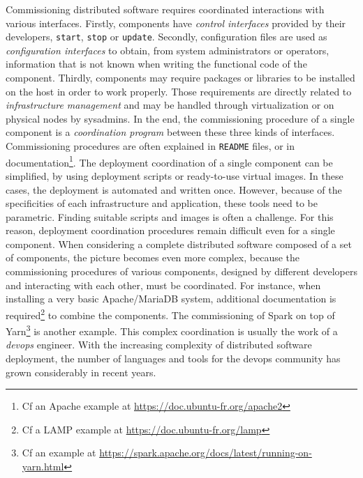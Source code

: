 Commissioning distributed software requires coordinated interactions
with various interfaces. Firstly, components have \emph{control
  interfaces} provided by their developers, \eg \texttt{start},
\texttt{stop} or \texttt{update}. Secondly, configuration files are
used as \emph{configuration interfaces} to obtain, from system
administrators or operators, information that is not known when
writing the functional code of the component. Thirdly, components may
require packages or libraries to be installed on the host in order
to work properly. Those requirements are directly related to
\emph{infrastructure management} and may be handled through
virtualization or on physical nodes by sysadmins.
%
In the end, the commissioning procedure of a single component is a
\emph{coordination program} between these three kinds of
interfaces. Commissioning procedures are often explained in
\texttt{README} files, or in
documentation\footnote{Cf an Apache example at \url{https://doc.ubuntu-fr.org/apache2}}. The
deployment coordination of a single component can be simplified, \eg
by using deployment scripts or ready-to-use virtual images. In these
cases, the deployment is automated and written once. However, because
of the specificities of each infrastructure and application, these
tools need to be parametric. Finding suitable scripts and images is
often a challenge. For this reason, deployment coordination procedures
remain difficult even for a single component.
%
When considering a complete distributed software composed of a set of
components, the picture becomes even more complex, because the
commissioning procedures of various components, designed by different
developers and interacting with each other, must be coordinated. For
instance, when installing a very basic Apache/MariaDB system,
additional documentation is
required\footnote{Cf a LAMP     example at \url{https://doc.ubuntu-fr.org/lamp}} to combine the
components. The commissioning of Spark on top of
Yarn\footnote{Cf an example at \url{https://spark.apache.org/docs/latest/running-on-yarn.html}}
is another example.
%
This complex coordination is usually the work of a \emph{devops}
engineer. With the increasing complexity of distributed software
deployment, the number of languages and tools for the devops community
has grown considerably in recent years.

